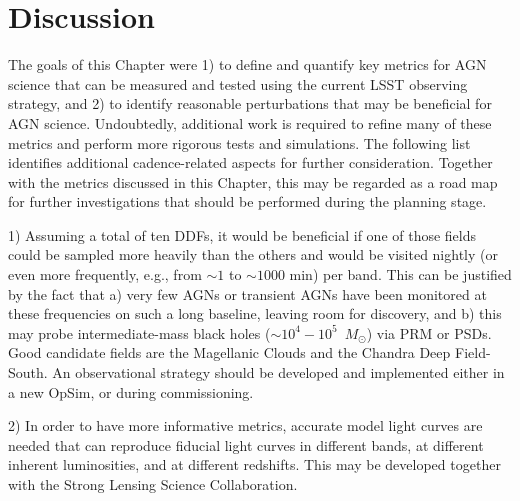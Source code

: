 \section{Discussion}\label{sec:AGNDiscussion}
\label{sec:\chpname:discussion}


The goals of this Chapter were 1) to define and quantify key metrics for AGN
science that can be measured and tested using the current LSST observing
strategy, and 2) to identify reasonable perturbations that may be beneficial
for AGN science.
%
Undoubtedly, additional work is required to refine many of these metrics
and perform more rigorous tests and simulations.
%
The following list identifies additional cadence-related aspects for further
consideration. Together with the metrics discussed in this Chapter, this may
be regarded as a road map for further investigations that should be performed
during the planning stage.

1) Assuming a total of ten DDFs, it would be beneficial if one of those fields
could be sampled more heavily than the others and would be visited nightly (or
even more frequently, e.g., from $\sim1$ to $\sim1000$ min) per band.
This can be justified by the fact that a) very few AGNs or transient AGNs have
been monitored at these frequencies on such a long baseline, leaving room for
discovery, and b) this may probe intermediate-mass black holes
($\sim10^4 - 10^5$~$M_{\odot}$) via PRM or PSDs. Good candidate fields are
the Magellanic Clouds and the Chandra Deep Field-South. An observational
strategy should be developed and implemented either in a new OpSim, or
during commissioning.


2) In order to have more informative metrics, accurate model light
curves are needed that can reproduce fiducial light curves in different
bands, at different inherent luminosities, and at different redshifts.
This may be developed together with the Strong Lensing Science Collaboration.



